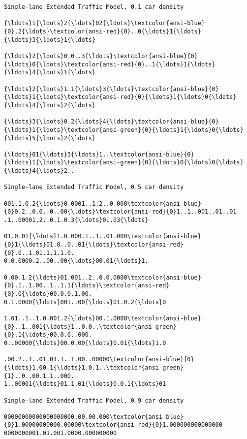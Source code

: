 \documentclass[11pt]{article}
\begin{document}
    \begin{Verbatim}[commandchars=\\\{\},fontsize=\footnotesize]
Single-lane Extended Traffic Model, 0.1 car density

{\ldots}1{\ldots}2{\ldots}02{\ldots}\textcolor{ansi-blue}{0}.2{\ldots}\textcolor{ansi-red}{0}..0{\ldots}1{\ldots}
{\ldots}3{\ldots}1{\ldots}

{\ldots}2{\ldots}0.0..3{\ldots}\textcolor{ansi-blue}{0}{\ldots}0{\ldots}\textcolor{ansi-red}{0}..1{\ldots}1{\ldots}
{\ldots}4{\ldots}1{\ldots}

{\ldots}2{\ldots}1.1{\ldots}3{\ldots}\textcolor{ansi-blue}{0}{\ldots}1{\ldots}\textcolor{ansi-red}{0}{\ldots}1{\ldots}0{\ldots}
{\ldots}4{\ldots}2{\ldots}

{\ldots}3{\ldots}0.2{\ldots}4{\ldots}\textcolor{ansi-blue}{0}{\ldots}1{\ldots}\textcolor{ansi-green}{0}{\ldots}1{\ldots}0{\ldots}
{\ldots}5{\ldots}2{\ldots}

{\ldots}01{\ldots}3{\ldots}1..\textcolor{ansi-blue}{0}{\ldots}1{\ldots}\textcolor{ansi-green}{0}{\ldots}0{\ldots}0{\ldots}
{\ldots}4{\ldots}2..

Single-lane Extended Traffic Model, 0.5 car density

001.1.0.2{\ldots}0.0001..1.2..0.000\textcolor{ansi-blue}{0}0.2..0.0..0..00{\ldots}\textcolor{ansi-red}{0}1..1..001..01..01
.1..00001.2..0.1.0.3{\ldots}01.03{\ldots}

01.0.01{\ldots}1.0.000.1..1..01.000\textcolor{ansi-blue}{0}1{\ldots}01.0..0..01{\ldots}\textcolor{ansi-red}{0}.0..1.01.1.1.1.0.
0.0.0000.2..00..00{\ldots}00.01{\ldots}1.

0.00.1.2{\ldots}01.001..2..0.0.0000\textcolor{ansi-blue}{0}.1..1.00..1..1.1{\ldots}\textcolor{ansi-red}{0}.0{\ldots}00.0.0.1.00.
0.1.0000{\ldots}001..00{\ldots}01.0.2{\ldots}0

1.01..1..1.0.001.2{\ldots}00.1.0000\textcolor{ansi-blue}{0}..1..001{\ldots}1..0.0..\textcolor{ansi-green}{0}.1{\ldots}00.0.0..000.
0..00000{\ldots}00.0.00{\ldots}0.01{\ldots}1.0

.00.2..1..01.01.1..1.00..00000\textcolor{ansi-blue}{0}{\ldots}1.00.1{\ldots}1.0.1..\textcolor{ansi-green}{1}..0..00.1.1..000.
1..00001{\ldots}01.1.01{\ldots}0.0.1{\ldots}01

Single-lane Extended Traffic Model, 0.9 car density

00000000000000000000.00.00.000\textcolor{ansi-blue}{0}1.00000000000.00000\textcolor{ansi-red}{0}1.000000000000000
0000000001.01.001.0000.000000000


\end{Verbatim}
\end{document}
